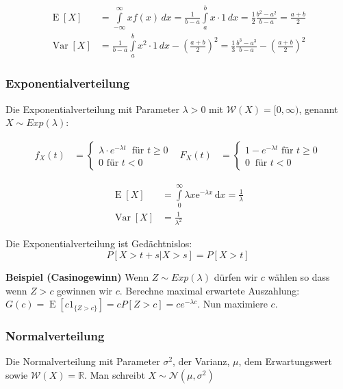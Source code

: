 \documentclass[25pt]{sciposter}
\newcommand{\R}{\mathbb{R}}
\newcommand{\W}{\mathcal{W}}
\newcommand{\Nor}{\mathcal{N}}
\newcommand{\Var}{\operatorname{Var}}
\newcommand{\E}{\operatorname{E}}
\begin{document}
\begin{multicols}{3}
\begin{align*}
\E[X] &= {\displaystyle\int \limits _{-\infty }^{\infty }xf(x)\,dx={\frac {1}{b-a}}\int \limits _{a}^{b}x\cdot 1\,dx={\frac {1}{2}}{\frac {b^{2}-a^{2}}{b-a}}={\frac {a+b}{2}}} \\ \Var[X] &={\frac {1}{b-a}}\int \limits _{a}^{b}{x^{2}\cdot 1\,dx}-\left({\frac {a+b}{2}}\right)^{2}={\frac {1}{3}}{\frac {b^{3}-a^{3}}{b-a}}-\left({\frac {a+b}{2}}\right)^{2}
\end{align*}




\subsubsection*{Exponentialverteilung}
Die Exponentialverteilung mit Parameter $\lambda > 0$ mit $\W(X)=[0,\infty)$, genannt $X\sim Exp(\lambda)$:

\begin{align*}
f_X(t) &= \begin{cases}
\lambda \cdot e^{-\lambda t} \ \text{ für } t \geq 0\\
0 \text{ für } t < 0
\end{cases}
& 
F_X(t) &= \begin{cases}
1-e^{-\lambda t} \text{ für } t\geq 0\\
0 \ \text{ für } t < 0
\end{cases}
\end{align*}

\begin{align*}
	\E[X]&=\int \limits _{0}^{\infty }\lambda x{\mathrm  {e}}^{{-\lambda x}}\,{\mathrm  {d}}x={\frac  {1}{\lambda }}\\
	\Var[X] &= \frac{1}{\lambda^2}
\end{align*}

Die Exponentialverteilung ist Gedächtnislos: 
$$P[X > t+s| X > s] = P[X > t]$$

\textbf{Beispiel (Casinogewinn)} Wenn $Z\sim Exp(\lambda)$ dürfen wir $c$ wählen so dass wenn $Z > c$ gewinnen wir $c$. Berechne maximal erwartete Auszahlung: $G(c) = \E[c1_{\{Z > c\}}] = cP[Z > c] = ce^{-\lambda c}$. Nun maximiere $c$.

\subsubsection*{Normalverteilung}
Die Normalverteilung mit Parameter $\sigma^2$, der Varianz, $\mu$, dem Erwartungswert sowie $\W(X) = \R$. Man schreibt $X\sim \Nor(\mu,\sigma^2)$


\end{multicols}
\end{document}
